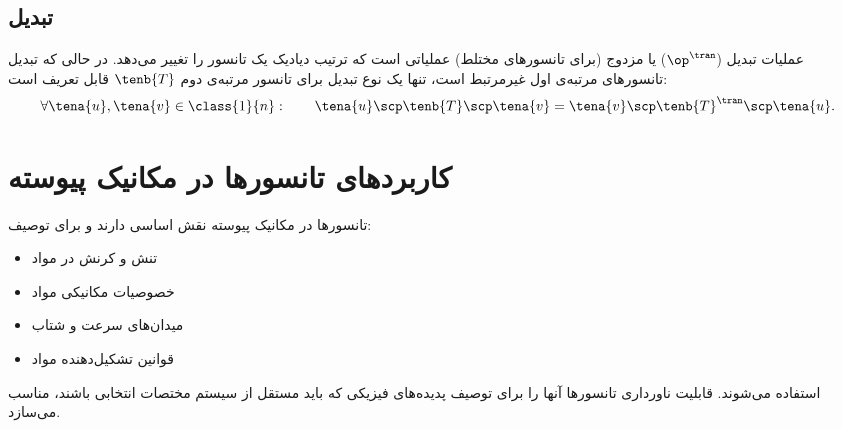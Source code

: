 \subsection{تبدیل}
عملیات تبدیل ($\op^\tran$) یا مزدوج (برای تانسورهای مختلط) عملیاتی است که ترتیب دیادیک یک تانسور را تغییر می‌دهد. در حالی که تبدیل تانسورهای مرتبه‌ی اول غیرمرتبط است، تنها یک نوع تبدیل برای تانسور مرتبه‌ی دوم $\tenb{T}$ قابل تعریف است:
\begin{equation}
    \forall \tena{u},\tena{v}\in \class{1}{n}:\qquad \tena{u}\scp\tenb{T}\scp\tena{v}=\tena{v}\scp\tenb{T}^\tran\scp\tena{u}.
\end{equation}

\section{کاربردهای تانسورها در مکانیک پیوسته}

تانسورها در مکانیک پیوسته نقش اساسی دارند و برای توصیف:
\begin{itemize}
    \item تنش و کرنش در مواد
    \item خصوصیات مکانیکی مواد
    \item میدان‌های سرعت و شتاب
    \item قوانین تشکیل‌دهنده مواد
\end{itemize}

استفاده می‌شوند. قابلیت ناورداری تانسورها آنها را برای توصیف پدیده‌های فیزیکی که باید مستقل از سیستم مختصات انتخابی باشند، مناسب می‌سازد.